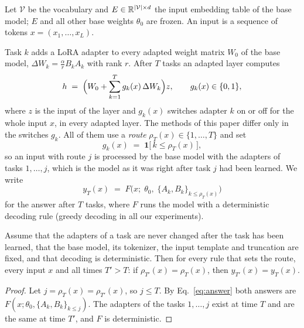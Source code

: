 Let $\mathcal{V}$ be the vocabulary and $E \in \mathbb{R}^{|\mathcal{V}| \times d}$ the input embedding
table of the base model; $E$ and all other base weights $\theta_0$ are frozen. An input is a
sequence of tokens $x = (x_1, \dots, x_L)$.

Task $k$ adds a LoRA adapter \citep{hu2022lora} to every adapted weight matrix $W_0$ of the base
model, $\Delta W_k = \tfrac{\alpha}{r} B_k A_k$ with rank $r$. After $T$ tasks an adapted layer
computes
\begin{equation}
  h \;=\; \Bigl( W_0 + \sum_{k=1}^{T} g_k(x)\, \Delta W_k \Bigr) z ,
  \qquad g_k(x) \in \{0, 1\},
  \label{eq:layer}
\end{equation}
where $z$ is the input of the layer and $g_k(x)$ switches adapter $k$ on or off for the whole input
$x$, in every adapted layer. The methods of this paper differ only in the switches $g_k$. All of
them use a \emph{route} $\rho_T(x) \in \{1, \dots, T\}$ and set
\begin{equation}
  g_k(x) \;=\; \mathbf{1}\bigl[\, k \le \rho_T(x) \,\bigr] ,
  \label{eq:gates}
\end{equation}
so an input with route $j$ is processed by the base model with the adapters of tasks $1, \dots, j$,
which is the model as it was right after task $j$ had been learned. We write
\begin{equation}
  y_T(x) \;=\; F\bigl(x;\; \theta_0,\; \{A_k, B_k\}_{k \le \rho_T(x)}\bigr)
  \label{eq:answer}
\end{equation}
for the answer after $T$ tasks, where $F$ runs the model with a deterministic decoding rule (greedy
decoding in all our experiments).

\begin{lemma}
\label{lem:route}
Assume that the adapters of a task are never changed after the task has been learned, that the
base model, its tokenizer, the input template and truncation are fixed, and that decoding is
deterministic. Then for every rule that sets the route, every input $x$ and all times $T' > T$:
if $\rho_{T'}(x) = \rho_T(x)$, then $y_{T'}(x) = y_T(x)$.
\end{lemma}

\begin{proof}
Let $j = \rho_T(x) = \rho_{T'}(x)$, so $j \le T$. By Eq.~\eqref{eq:answer} both answers are
$F(x; \theta_0, \{A_k, B_k\}_{k \le j})$. The adapters of the tasks $1, \dots, j$ exist at time $T$
and are the same at time $T'$, and $F$ is deterministic.
\end{proof}

